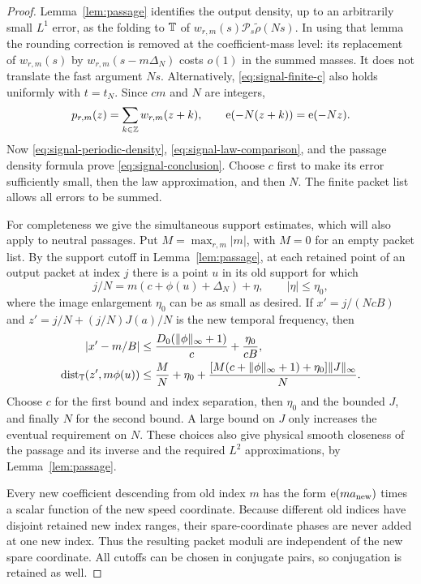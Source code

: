 \begin{proof}
Lemma~\ref{lem:passage} identifies the output density, up to an
arbitrarily small $L^1$ error, as the folding to $\mathbb T$ of
$w_{r,m}(s)\mathcal P_s\widetilde\rho(Ns)$.
In using that lemma the rounding correction is removed at the
coefficient-mass level: its replacement of $w_{r,m}(s)$ by
$w_{r,m}(s-m\Delta_N)$ costs $o(1)$ in the summed masses.  It does
not translate the fast argument $Ns$.  Alternatively,
\eqref{eq:signal-finite-c} also holds uniformly with $t=t_N$.
Since $cm$ and $N$ are integers,
\[
 p_{r,m}(z)=\sum_{k\in\mathbb Z}w_{r,m}(z+k),
 \qquad \operatorname{e}(-N(z+k))=\operatorname{e}(-Nz).
\]
Now \eqref{eq:signal-periodic-density},
\eqref{eq:signal-law-comparison}, and the passage density formula
prove \eqref{eq:signal-conclusion}.  Choose $c$ first to make its
error sufficiently small, then the law approximation, and then $N$.
The finite packet list allows all errors to be summed.

For completeness we give the simultaneous support estimates, which
will also apply to neutral passages.  Put
$M=\max_{r,m}|m|$, with $M=0$ for an empty packet list.
By the support cutoff in
Lemma~\ref{lem:passage}, at each retained point of an output packet at
index $j$ there is a point $u$ in its old support for which
\begin{equation}
 j/N=m(c+\phi(u)+\Delta_N)+\eta,
 \qquad |\eta|\le\eta_0,
 \label{eq:signal-retained-support}
\end{equation}
where the image enlargement $\eta_0$ can be as small as desired.
If $x'=j/(NcB)$ and $z'=j/N+(j/N)J(a)/N$ is the new temporal
frequency, then
\begin{align}
 |x'-m/B|
 &\le\frac{D_0(\|\phi\|_\infty+1)}c+\frac{\eta_0}{cB},
 \label{eq:signal-index-drift}\\
 \operatorname{dist}_\mathbb T(z',m\phi(u))
 &\le\frac MN+\eta_0
  +\frac{[M(c+\|\phi\|_\infty+1)+\eta_0]\|J\|_\infty}{N}.
 \label{eq:signal-temporal-drift}
\end{align}
Choose $c$ for the first bound and index separation, then $\eta_0$
and the bounded $J$, and finally $N$ for the second bound.  A large
bound on $J$ only increases the eventual requirement on $N$.
These choices also give physical smooth closeness of the passage and
its inverse and the required $L^2$ approximations, by
Lemma~\ref{lem:passage}.

Every new coefficient descending from old index $m$ has the form
$\operatorname{e}(ma_{\rm new})$ times a scalar function of the new speed
coordinate.  Because different old indices have disjoint retained
new index ranges, their spare-coordinate phases are never added at
one new index.  Thus the resulting packet moduli are independent of
the new spare coordinate.  All cutoffs can be chosen in conjugate
pairs, so conjugation is retained as well.
\end{proof}


